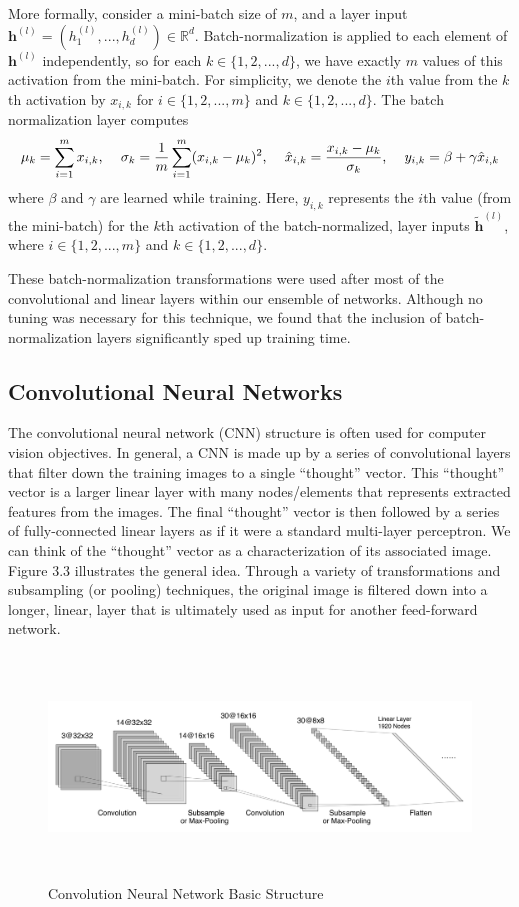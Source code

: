 \documentclass [MAS] {uclathes}
\begin{document}
More formally, consider a mini-batch size of $m$, and a layer input $\mathbf{h}^{(l)} = (h^{(l)}_1, ..., h^{(l)}_d) \in \mathbb{R}^d$. Batch-normalization is applied to each element of $\mathbf{h}^{(l)}$ independently, so for each $k \in \{1, 2, ..., d \}$, we have exactly $m$ values of this activation from the mini-batch. For simplicity, we denote the $i$th value from the $k$th activation by $x_{i,k}$ for $i \in \{1, 2, ..., m \}$ and $k \in \{1, 2, ..., d \}$. The batch normalization layer computes $$\mu_k = \sum_{i=1}^{m} x_{i, k} \text{, \quad} \sigma_k = \frac{1}{m} \sum_{i=1}^{m} (x_{i, k} - \mu_k)^2 \text{, \quad} \hat{x}_{i,k} = \frac{x_{i,k} - \mu_k}{\sigma_k} \text{, \quad} y_{i, k} = \beta + \gamma \hat{x}_{i,k}$$ where $\beta$ and $\gamma$ are learned while training. Here, $y_{i, k}$ represents the $i$th value (from the mini-batch) for the $k$th activation of the batch-normalized, layer inputs $\tilde{\mathbf{h}}^{(l)}$, where $i \in \{1, 2, ..., m \}$ and $k \in \{1, 2, ..., d \}$.

These batch-normalization transformations were used after most of the convolutional and linear layers within our ensemble of networks. Although no tuning was necessary for this technique, we found that the inclusion of batch-normalization layers significantly sped up training time.


\subsection{Convolutional Neural Networks}

The convolutional neural network (CNN) structure is often used for computer vision objectives. In general, a CNN is made up by a series of convolutional layers that filter down the training images to a single ``thought'' vector. This ``thought'' vector is a larger linear layer with many nodes/elements that represents extracted features from the images. The final ``thought'' vector is then followed by a series of fully-connected linear layers as if it were a standard multi-layer perceptron. We can think of the ``thought'' vector as a characterization of its associated image. Figure 3.3 illustrates the general idea. Through a variety of transformations and subsampling (or pooling) techniques, the original image is filtered down into a longer, linear, layer that is ultimately used as input for another feed-forward network.

\begin{figure}[h]
\centering
\includegraphics[height = 60mm, width=160mm]{imgs/cnn_s1.png}
\caption{Convolution Neural Network Basic Structure}
\label{fig:cnn1}
\end{figure}
\end{document}
